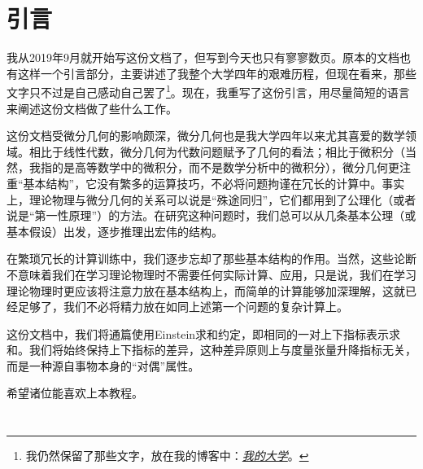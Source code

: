 \part{引言}
    我从2019年9月就开始写这份文档了，但写到今天也只有寥寥数页。原本的文档也有这样一个引言部分，主要讲述了我整个大学四年的艰难历程，但现在看来，那些文字只不过是自己感动自己罢了\footnote{我仍然保留了那些文字，放在我的博客中：\href{https://shunzdai.now.sh/2020/06/04/My-Life-In-College/}{\textit{我的大学}}。}。现在，我重写了这份引言，用尽量简短的语言来阐述这份文档做了些什么工作。
	
    这份文档受微分几何的影响颇深，微分几何也是我大学四年以来尤其喜爱的数学领域。相比于线性代数，微分几何为代数问题赋予了几何的看法；相比于微积分（当然，我指的是高等数学中的微积分，而不是数学分析中的微积分），微分几何更注重“基本结构”，它没有繁多的运算技巧，不必将问题拘谨在冗长的计算中。事实上，理论物理与微分几何的关系可以说是“殊途同归”，它们都用到了公理化（或者说是“第一性原理”）的方法。在研究这种问题时，我们总可以从几条基本公理（或基本假设）出发，逐步推理出宏伟的结构。
    
    在繁琐冗长的计算训练中，我们逐步忘却了那些基本结构的作用。当然，这些论断不意味着我们在学习理论物理时不需要任何实际计算、应用，只是说，我们在学习理论物理时更应该将注意力放在基本结构上，而简单的计算能够加深理解，这就已经足够了，我们不必将精力放在如同上述第一个问题的复杂计算上。

    这份文档中，我们将通篇使用Einstein求和约定，即相同的一对上下指标表示求和。我们将始终保持上下指标的差异，这种差异原则上与度量张量升降指标无关，而是一种源自事物本身的“对偶”属性。

    希望诸位能喜欢上本教程。
    
    $\quad$

    $\quad$

    